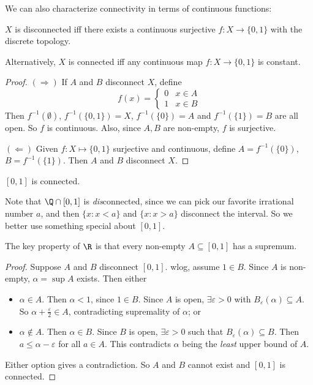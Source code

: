 \documentclass[a4paper]{article}
\begin{document}
We can also characterize connectivity in terms of continuous functions:
\begin{prop}
  $X$ is disconnected iff there exists a continuous surjective $f: X\to \{0, 1\}$ with the discrete topology.

  Alternatively, $X$ is connected iff any continuous map $f: X \to \{0, 1\}$ is constant.
\end{prop}

\begin{proof}
  $(\Rightarrow)$ If $A$ and $B$ disconnect $X$, define
  \[
    f(x) =
    \begin{cases}
      0 & x\in A\\
      1 & x\in B
    \end{cases}
  \]
  Then $f^{-1}(\emptyset)$, $f^{-1}(\{0, 1\}) = X$, $f^{-1}(\{0\}) = A$ and $f^{-1}(\{1\}) = B$ are all open. So $f$ is continuous. Also, since $A, B$ are non-empty, $f$ is surjective.

  $(\Leftarrow)$ Given $f: X\mapsto \{0, 1\}$ surjective and continuous, define $A = f^{-1}(\{0\})$, $B = f^{-1}(\{1\})$. Then $A$ and $B$ disconnect $X$.
\end{proof}

\begin{thm}
  $[0, 1]$ is connected.
\end{thm}

Note that $\Q\cap [0, 1]$ is \emph{dis}connected, since we can pick our favorite irrational number $a$, and then $\{x: x < a\}$ and $\{x: x > a\}$ disconnect the interval. So we better use something special about $[0, 1]$.

The key property of $\R$ is that every non-empty $A\subseteq [0, 1]$ has a supremum.
\begin{proof}
  Suppose $A$ and $B$ disconnect $[0, 1]$. wlog, assume $1\in B$. Since $A$ is non-empty, $\alpha = \sup A$ exists. Then either
  \begin{itemize}
    \item $\alpha \in A$. Then $\alpha < 1$, since $1 \in B$. Since $A$ is open, $\exists \varepsilon > 0$ with $B_\varepsilon(\alpha) \subseteq A$. So $\alpha + \frac{\varepsilon}{2} \in A$, contradicting supremality of $\alpha$; or

    \item $\alpha \not\in A$. Then $\alpha \in B$. Since $B$ is open, $\exists \varepsilon > 0$ such that $B_\varepsilon (\alpha) \subseteq B$. Then $a \leq \alpha - \varepsilon$ for all $a\in A$. This contradicts $\alpha$ being the \emph{least} upper bound of $A$.
  \end{itemize}

  Either option gives a contradiction. So $A$ and $B$ cannot exist and $[0, 1]$ is connected.
\end{proof}
\end{document}
